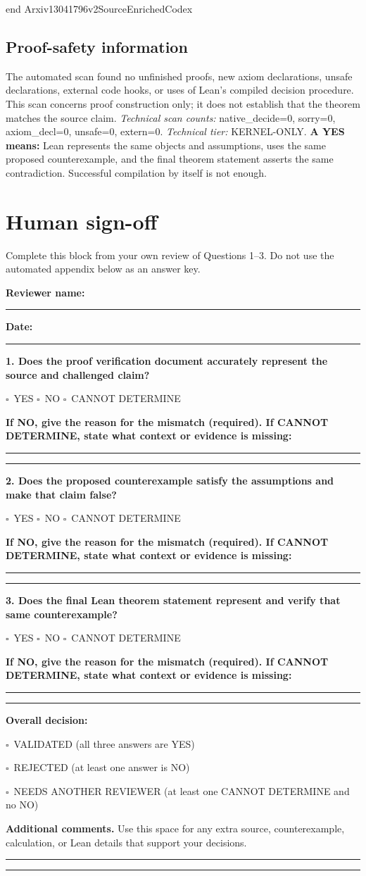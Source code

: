 \documentclass[11pt]{article}
\newcommand{\checkbox}{$\square$}
\newcommand{\answerchoices}{\checkbox\ YES \quad \checkbox\ NO \quad \checkbox\ CANNOT DETERMINE}
\newcommand{\decisionexplanation}{%
  \par\smallskip\textbf{If NO, give the reason for the mismatch (required). If
  CANNOT DETERMINE, state what context or evidence is missing:}\par
  \rule{\linewidth}{0.4pt}\par\vspace{7pt}\rule{\linewidth}{0.4pt}\par}
\begin{document}
\begin{Vlean}
end Arxiv13041796v2SourceEnrichedCodex

\end{Vlean}
\subsection*{Proof-safety information}
The automated scan found no unfinished proofs, new axiom declarations, unsafe declarations, external code hooks, or uses of Lean's compiled decision procedure. This scan concerns proof construction only; it does not establish that the theorem matches the source claim.
\textit{Technical scan counts:} native\_decide=0, sorry=0, axiom\_decl=0, unsafe=0, extern=0. \textit{Technical tier:} KERNEL-ONLY.
\textbf{A YES means:} Lean represents the same objects and assumptions, uses the same proposed counterexample, and the final theorem statement asserts the same contradiction. Successful compilation by itself is not enough.
\clearpage
\section*{Human sign-off}
Complete this block from your own review of Questions 1--3. Do not use the automated appendix below as an answer key.\par
\textbf{Reviewer name:} \rule{9cm}{0.4pt}\par
\textbf{Date:} \rule{4cm}{0.4pt}\par
\medskip\textbf{1. Does the proof verification document accurately represent the source and challenged claim?}\par
\answerchoices\par
\decisionexplanation
\medskip\textbf{2. Does the proposed counterexample satisfy the assumptions and make that claim false?}\par
\answerchoices\par
\decisionexplanation
\medskip\textbf{3. Does the final Lean theorem statement represent and verify that same counterexample?}\par
\answerchoices\par
\decisionexplanation
\medskip\textbf{Overall decision:}\par
\checkbox\ VALIDATED (all three answers are YES)\par
\checkbox\ REJECTED (at least one answer is NO)\par
\checkbox\ NEEDS ANOTHER REVIEWER (at least one CANNOT DETERMINE and no NO)\par
\medskip\textbf{Additional comments.} Use this space for any extra source, counterexample, calculation, or Lean details that support your decisions.\par\rule{\linewidth}{0.4pt}\par\vspace{7pt}\rule{\linewidth}{0.4pt}
\clearpage
\end{document}
